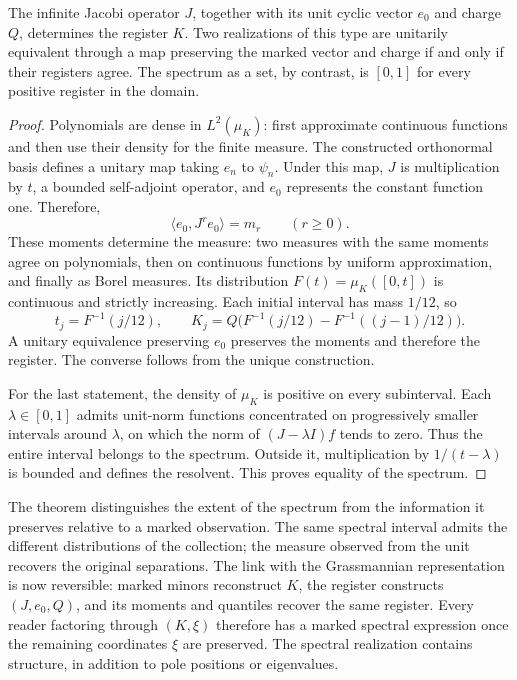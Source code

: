 \begin{theorem}
\label{thm:jacobi-marked-faithfulness}
The infinite Jacobi operator \(J\), together with its unit cyclic
vector \(e_0\) and charge \(Q\), determines the register \(K\).
Two realizations of this type are unitarily equivalent through a map
preserving the marked vector and charge if and only if their registers
agree. The spectrum as a set, by contrast, is \([0,1]\) for every
positive register in the domain.
\end{theorem}
\begin{proof}
Polynomials are dense in \(L^2(\mu_K)\): first approximate continuous
functions and then use their density for the finite measure.
The constructed orthonormal basis defines a unitary map taking
\(e_n\) to \(\psi_n\). Under this map, \(J\) is multiplication
by \(t\), a bounded self-adjoint operator, and \(e_0\) represents
the constant function one. Therefore,
\[
 \langle e_0,J^re_0\rangle=m_r\qquad(r\geq0).
\]
These moments determine the measure: two measures with the same
moments agree on polynomials, then on continuous functions by uniform
approximation, and finally as Borel measures. Its distribution
\(F(t)=\mu_K([0,t])\) is continuous and strictly increasing.
Each initial interval has mass \(1/12\), so
\[
 t_j=F^{-1}(j/12),\qquad
 K_j=Q\bigl(F^{-1}(j/12)-F^{-1}((j-1)/12)\bigr).
\]
A unitary equivalence preserving \(e_0\) preserves the moments and
therefore the register. The converse follows from the unique
construction.

For the last statement, the density of \(\mu_K\) is positive on
every subinterval. Each \(\lambda\in[0,1]\) admits unit-norm
functions concentrated on progressively smaller intervals around
\(\lambda\), on which the norm of \((J-\lambda I)f\) tends
to zero. Thus the entire interval belongs to the spectrum. Outside
it, multiplication by \(1/(t-\lambda)\) is bounded and defines
the resolvent. This proves equality of the spectrum.
\end{proof}

The theorem distinguishes the extent of the spectrum from the
information it preserves relative to a marked observation. The same
spectral interval admits the different distributions of the collection;
the measure observed from the unit recovers the original separations.
The link with the Grassmannian representation is now reversible:
marked minors reconstruct \(K\), the register constructs
\((J,e_0,Q)\), and its moments and quantiles recover the same
register. Every reader factoring through \((K,\xi)\) therefore
has a marked spectral expression once the remaining coordinates
\(\xi\) are preserved. The spectral realization contains structure,
in addition to pole positions or eigenvalues.
